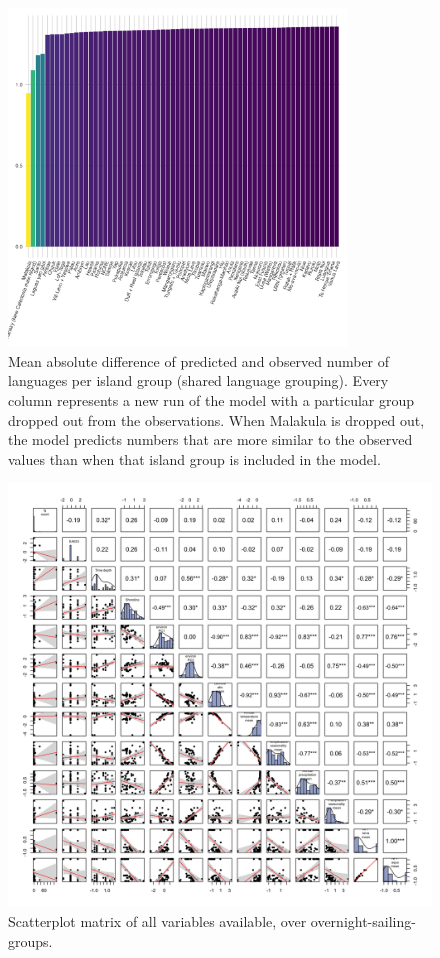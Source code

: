 \documentclass[unnumsec,webpdf,modern,medium]{oup-authoring-template}
\begin{document}
\begin{appendices}
\begin{figure}[ht]
\centering

\includegraphics[width=0.8\textwidth]{brms_medium_dropped_out_plot_diff}
\caption{Mean absolute difference of predicted and observed number of languages per island group (shared language grouping). Every column represents a new run of the model with a particular group dropped out from the observations. When Malakula is dropped out, the model predicts numbers that are more similar to the observed values than when that island group is included in the model.}
\label{brms_medium_dropped_out_plot_diff}
\end{figure}


\begin{figure}[ht]
\centering
\includegraphics[width=\textwidth]{latex/SPLOM_SBZR_all_variables}
\caption{Scatterplot matrix of all variables available, over overnight-sailing-groups.}
\label{SPLOM_SBZR_all_variables}
\end{figure}


\end{appendices}
\end{document}
